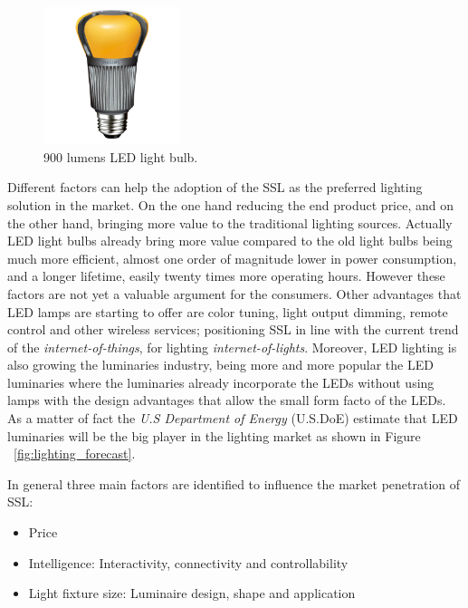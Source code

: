 \vspace{5mm} %


\begin{figure}[!h]
\centering
\includegraphics[width=4cm]{./0_intro/img/enduraled-12w.jpg}
\caption{900 lumens LED light bulb.}
\label{fig:l_prize}
\end{figure}

Different factors can help the adoption of the SSL as the preferred lighting solution in the market. On the one hand reducing the end product price, and on the other hand, bringing more value to the traditional lighting sources. Actually LED light bulbs already bring more value compared to the old light bulbs being much more efficient, almost one order of magnitude lower in power consumption, and a longer lifetime, easily twenty times more operating hours. However these factors are not yet a valuable argument for the consumers. Other advantages that LED lamps are starting to offer are color tuning, light output dimming, remote control and other wireless services; positioning SSL in line with the current trend of the \emph{internet-of-things}, for lighting \emph{internet-of-lights}. Moreover, LED lighting is also growing the luminaries industry, being more and more popular the LED luminaries where the luminaries already incorporate the LEDs without using lamps with the design advantages that allow the small form facto of the LEDs. As a matter of fact the \emph{U.S Department of Energy} (U.S.DoE) estimate that LED luminaries will be the big player in the lighting market as shown in Figure ~\ref{fig:lighting_forecast}.

In general three main factors are identified to influence the market penetration of SSL:
\begin{itemize}
  \item Price
  \item Intelligence: Interactivity, connectivity and controllability\
  \item Light fixture size: Luminaire design, shape and application
\end{itemize}

